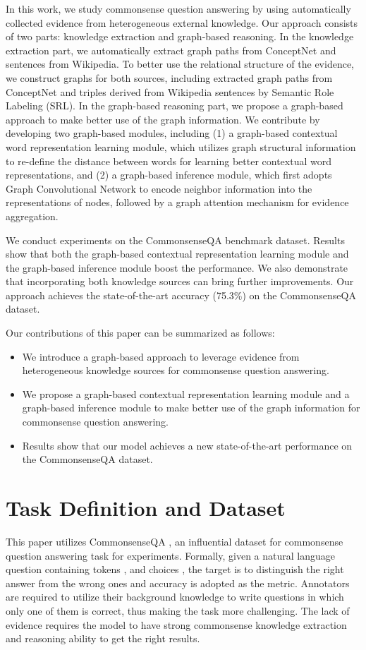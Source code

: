 \documentclass[letterpaper]{article} \usepackage{aaai20}  \usepackage{times}  \usepackage{helvet} \usepackage{courier}  \usepackage[hyphens]{url}  \usepackage{graphicx} \urlstyle{rm} \def\UrlFont{\rm}  \usepackage{graphicx}  \frenchspacing  \setlength{\pdfpagewidth}{8.5in}  \setlength{\pdfpageheight}{11in}
\begin{document}
In this work, we study commonsense question answering by 
using automatically 
collected evidence from heterogeneous external knowledge.
Our approach consists of two parts: knowledge extraction and graph-based reasoning. In the knowledge extraction part, we automatically extract graph paths from ConceptNet and sentences from Wikipedia. 
To better use the relational structure of the evidence, we construct graphs for both sources, including extracted graph paths from ConceptNet and 
triples derived from Wikipedia sentences by Semantic Role Labeling (SRL).
In the graph-based reasoning part, we propose a graph-based approach to make better use of the graph information.
We contribute by developing two graph-based modules, including (1) a graph-based contextual word representation learning module, which  utilizes graph structural information to re-define the distance between words for learning better contextual word representations, and (2) a graph-based inference module, which first
adopts Graph Convolutional Network \cite{kipf2016semi} to encode neighbor information into the representations of nodes, followed by a graph attention mechanism for evidence aggregation.

We conduct experiments on the CommonsenseQA benchmark dataset. 
Results show that both the graph-based contextual representation learning module and the graph-based inference module boost the performance.
We also demonstrate that incorporating both knowledge sources can bring further improvements.
Our approach
achieves the state-of-the-art accuracy (75.3\%) on the CommonsenseQA dataset.

Our contributions of this paper can be summarized as follows:
\begin{itemize}
    \item  We introduce a graph-based approach to leverage evidence from heterogeneous knowledge sources 
    for commonsense question answering.
    \item We propose a graph-based contextual representation learning module and a graph-based inference module to make better use of the graph information for commonsense question answering.
    \item Results show that our model achieves a new state-of-the-art performance on the CommonsenseQA dataset.
\end{itemize}



 \section{Task Definition and Dataset}
 This paper utilizes CommonsenseQA \cite{talmor2019commonsenseqa}, an influential dataset for commonsense question answering task for experiments. Formally, given a natural language question  containing  tokens , and  choices , the target is to distinguish the right answer from the wrong ones and accuracy is adopted as the metric. Annotators are required to utilize their background knowledge to write questions in which only one of them is correct, thus making the task more challenging. 
The lack of evidence requires the model to have strong commonsense knowledge extraction and reasoning ability to get the right results.
\end{document}
